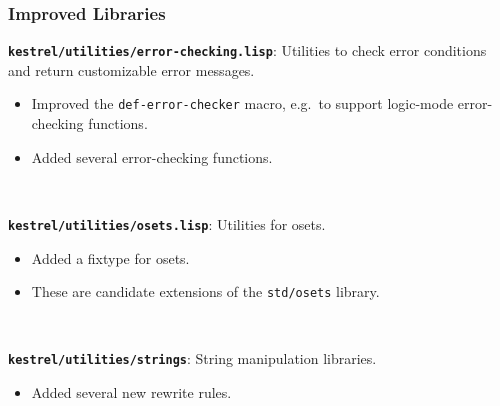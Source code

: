 \documentclass{beamer}
\newcommand{\code}[1]{\texttt{#1}}
\newcommand{\bookpath}[1]{\textbf{\code{#1}}}
\newcommand{\implibtitle}{\frametitle{Improved Libraries}}
\begin{document}

\begin{frame}

\implibtitle

\bookpath{kestrel/utilities/error-checking.lisp}:
Utilities to check error conditions and return customizable error messages.
\begin{itemize}
\item
Improved the \code{def-error-checker} macro,
e.g.\ to support logic-mode error-checking functions.
\item
Added several error-checking functions.
\end{itemize}

\

\bookpath{kestrel/utilities/osets.lisp}:
Utilities for osets.
\begin{itemize}
\item
Added a fixtype for osets.
\item
These are candidate extensions of the \code{std/osets} library.
\end{itemize}

\

\bookpath{kestrel/utilities/strings}:
String manipulation libraries.
\begin{itemize}
\item Added several new rewrite rules.
\end{itemize}

\end{frame}

\end{document}
